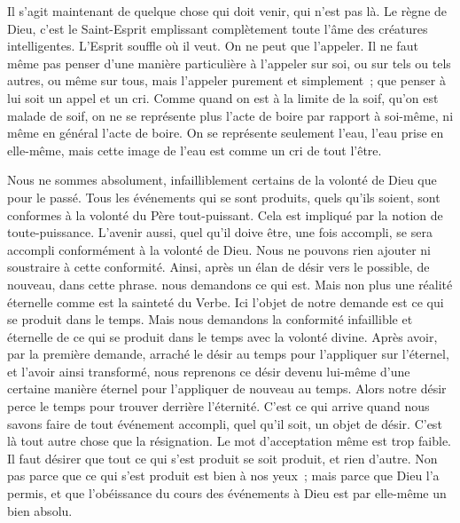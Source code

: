 \documentclass[french,twoside]{book} %
\newenvironment{quoteblock}%
  {\begin{quoting}}
  {\end{quoting}}
\newenvironment{quotebar}{%
    \def\FrameCommand{{\color{rubric!10!}\vrule width 0.5em} \hspace{0.9em}}%
    \def\OuterFrameSep{\itemsep} %
    \MakeFramed {\advance\hsize-\width \FrameRestore}
  }%
  {%
    \endMakeFramed
  }
\renewenvironment{quoteblock}%
  {%
    \savenotes
    \setstretch{0.9}
    \normalfont
    \begin{quotebar}
  }
  {%
    \end{quotebar}
    \spewnotes
  }
\begin{document}
\noindent Il s'agit maintenant de quelque chose qui doit venir, qui n'est pas là. Le règne de Dieu, c'est le Saint-Esprit emplissant complètement toute l'âme des créatures intelligentes. L'Esprit souffle où il veut. On ne peut que l'appeler. Il ne faut même pas penser d'une manière particulière à l'appeler sur soi, ou sur tels ou tels autres, ou même sur tous, mais l'appeler purement et simplement ; que penser à lui soit un appel et un cri. Comme quand on est à la limite de la soif, qu'on est malade de soif, on ne se représente plus l'acte de boire par rapport à soi-même, ni même en général l'acte de boire. On se représente seulement l'eau, l'eau prise en elle-même, mais cette image de l'eau est comme un cri de tout l'être.\par

\begin{quoteblock}
 \end{quoteblock}

\noindent Nous ne sommes absolument, infailliblement certains de la volonté de Dieu que pour le passé. Tous les événements qui se sont produits, quels qu'ils soient, sont conformes à la volonté du Père tout-puissant. Cela est impliqué par la notion de toute-puissance. L'avenir aussi, quel qu'il doive être, une fois accompli, se sera accompli conformément à la volonté de Dieu. Nous ne pouvons rien ajouter ni soustraire à cette conformité. Ainsi, après un élan de désir vers le possible, de nouveau, dans cette phrase. nous demandons ce qui est. Mais non plus une réalité éternelle comme est la sainteté du Verbe. Ici l'objet de notre demande est ce qui se produit dans le temps. Mais nous demandons la conformité infaillible et éternelle de ce qui se produit dans le temps avec la volonté divine. Après avoir, par la première demande, arraché le désir au temps pour l'appliquer sur l'éternel, et l'avoir ainsi transformé, nous reprenons ce désir devenu lui-même d'une certaine manière éternel pour l'appliquer de nouveau au temps. Alors notre désir perce le temps pour trouver derrière l'éternité. C'est ce qui arrive quand nous savons faire de tout événement accompli, quel qu'il soit, un objet de désir. C'est là tout autre chose que la résignation. Le mot d'acceptation même est trop faible. Il faut désirer que tout ce qui s'est produit se soit produit, et rien d'autre. Non pas parce que ce qui s'est produit est bien à nos yeux ; mais parce que Dieu l'a permis, et que l'obéissance du cours des événements à Dieu est par elle-même un bien absolu.\par
\end{document}

